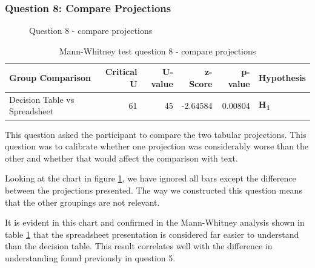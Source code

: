\pagebreak
\subsubsection{Question 8: Compare Projections}

\begin{figure}
    \centering
    \caption{Question 8 - compare projections}
    \label{fig:stackedbar_Q4}
\end{figure}

\begin{table}
    \begin{center}
        \begin{tabular}{ |l ||r |r |r | r|l | } 
            \hline
            Group Comparison                 & Critical U & U-value & z-Score  & p-value & Hypothesis         \\
            \hline
            \hline
            Decision Table vs Spreadsheet    & 61         & 45      &  -2.64584& 0.00804 & \textbf{H\textsubscript{1}} \\ 
            \hline
        \end{tabular}
    \end{center}
    \caption{Mann-Whitney test question 8 - compare projections}
    \label{table:mannwhitneyQ4}
\end{table}

This question asked the participant to compare the two tabular projections.  
This question was to calibrate whether one projection was considerably worse than the other and whether that would affect the comparison with text.

Looking at the chart in figure \ref{fig:stackedbar_Q4}, we have ignored all bars except the difference between the projections presented.
The way we constructed this question means that the other groupings are not relevant.

It is evident in this chart and confirmed in the Mann-Whitney analysis shown in table \ref{table:mannwhitneyQ4} that the spreadsheet presentation is considered far easier to understand than the decision table.
This result correlates well with the difference in understanding found previously in question 5.


